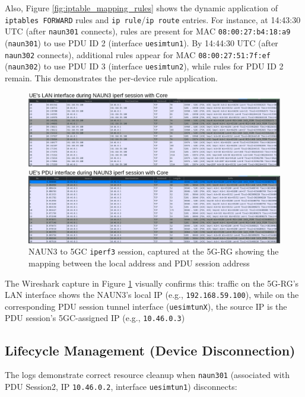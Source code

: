 Also, Figure \ref{fig:iptable_mapping_rules} shows the dynamic application of \texttt{iptables FORWARD} rules and \texttt{ip rule}/\texttt{ip route} entries. For instance, at 14:43:30 \ac{UTC} (after \texttt{naun301} connects), rules are present for \ac{MAC} \texttt{08:00:27:b4:18:a9} (\texttt{naun301}) to use \ac{PDU} ID 2 (interface \texttt{uesimtun1}). By 14:44:30 \ac{UTC} (after \texttt{naun302} connects), additional rules appear for \ac{MAC} \texttt{08:00:27:51:7f:ef} (\texttt{naun302}) to use \ac{PDU} ID 3 (interface \texttt{uesimtun2}), while rules for \ac{PDU} ID 2 remain. This demonstrates the per-device rule application.

\begin{figure}
    \centering
    \includegraphics[width=1\linewidth]{figs/naun3_to_core_ue_view.png}
    \caption{\acs{NAUN3} to \acs{5GC} \texttt{iperf3} session, captured at the \acs{5G-RG} showing the mapping between the local address and \acs{PDU} session address}
    \label{fig:naun3_to_core_ue_view}
\end{figure}

The Wireshark capture in Figure \ref{fig:naun3_to_core_ue_view} visually confirms this: traffic on the \ac{5G-RG}'s \ac{LAN} interface shows the \ac{NAUN3}'s local \ac{IP} (e.g., \texttt{192.168.59.100}), while on the corresponding \ac{PDU} session tunnel interface (\texttt{uesimtunX}), the source \ac{IP} is the \ac{PDU} session's \ac{5GC}-assigned \ac{IP} (e.g., \texttt{10.46.0.3})

\subsection{Lifecycle Management (Device Disconnection)}

The logs demonstrate correct resource cleanup when \texttt{naun301} (associated with \ac{PDU} Session2, \ac{IP} \texttt{10.46.0.2}, interface \texttt{uesimtun1}) disconnects:

